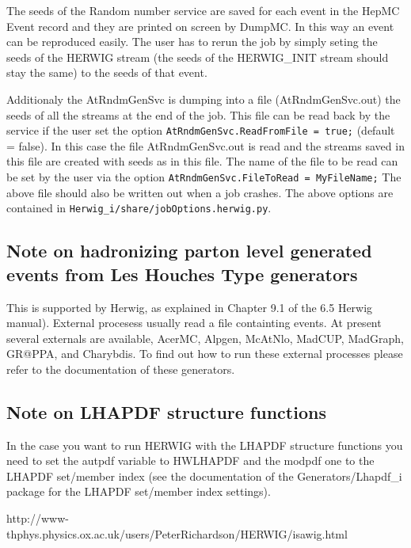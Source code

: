 \documentclass[11pt]{article}
\begin{document}
The seeds of the Random number service are saved for each event in
the HepMC Event record and they are printed on screen by DumpMC. In
this way an event can be reproduced easily. The user has to rerun the
job by simply seting the seeds of the HERWIG stream (the seeds of the
HERWIG\_INIT stream should stay the same) to the seeds of that event.

Additionaly the AtRndmGenSvc is dumping into a file (AtRndmGenSvc.out)
the seeds of all the streams at the end of the job. This file can be
read back by the service if the user set the option
{\tt AtRndmGenSvc.ReadFromFile = true;} 
(default = false). In this case the file
AtRndmGenSvc.out is read and the streams saved in this file are
created with seeds as in this file. The name of the file to be read
can be set by the user via the option
{\tt AtRndmGenSvc.FileToRead = MyFileName;}
The above file should also be written out when a job crashes. 
The above options are contained in 
{\tt Herwig\_i/share/jobOptions.herwig.py}.

\subsection*{Note on hadronizing parton level generated events from Les Houches Type generators}

This is supported by Herwig, as explained in Chapter 9.1 of the 6.5 Herwig
manual). External procesess usually read a file containting events.
At present several externals are available, AcerMC, Alpgen, McAtNlo,
MadCUP, MadGraph, GR@PPA, and Charybdis. To find out how to run these
external processes please refer to the documentation of these generators.

\subsection*{Note on LHAPDF structure functions}

\noindent
In the case you want to run HERWIG with the LHAPDF structure functions
you need to set the autpdf variable to HWLHAPDF and the modpdf one to
the LHAPDF set/member index (see the documentation of the
Generators/Lhapdf\_i package for the LHAPDF set/member index
settings).

\begin{thebibliography}{99}
  http://www-thphys.physics.ox.ac.uk/users/PeterRichardson/HERWIG/isawig.html
\end{thebibliography}
\end{document}
